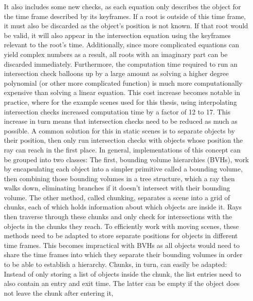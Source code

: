 It also includes some new checks,
as each equation only describes the object for the time frame described by its keyframes.
If a root is outside of this time frame,
it must also be discarded as the object's position is not known.
If that root would be valid,
it will also appear in the intersection equation using the keyframes relevant to the root's time.
Additionally, since more complicated equations can yield complex numbers as a result,
all roots with an imaginary part can be discarded immediately.
\newline
Furthermore, the computation time required to run an intersection check
balloons up by a large amount as solving a higher degree polynomial (or other more complicated function)
is much more computationally expensive than solving a linear equation.
This cost increase becomes notable in practice, where for the example scenes used for this thesis,
using interpolating intersection checks increased computation time by a factor of 12 to 17.
\newline
This increase in turn means that intersection checks need to be reduced as much as possible.
A common solution for this in static scenes is to separate objects by their position,
then only run intersection checks with objects whose position the ray can reach in the first place.
\newline
In general, implementations of this concept can be grouped into two classes:
The first, bounding volume hierarchies (BVHs), work by encapsulating each object into a simpler primitive called a bounding volume,
then combining those bounding volumes in a tree structure,
which a ray then walks down, eliminating branches if it doesn't intersect with their bounding volume.
The other method, called chunking, separates a scene into a grid of chunks,
each of which holds information about which objects are inside it.
Rays then traverse through these chunks and only check for intersections with the objects in the chunks they reach.
\newline
To efficiently work with moving scenes,
these methods need to be adapted to store separate positions for objects in different time frames.
This becomes impractical with BVHs as all objects would need to share the time frames
into which they separate their bounding volumes in order to be able to establish a hierarchy.
\newline
Chunks, in turn, can easily be adapted:
Instead of only storing a list of objects inside the chunk,
the list entries need to also contain an entry and exit time.
The latter can be empty if the object does not leave the chunk after entering it,
